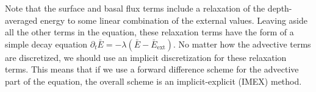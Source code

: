 \documentclass{article}
\theoremstyle{definition}
\theoremstyle{plain}
\begin{document}
Note that the surface and basal flux terms include a relaxation of the depth-averaged energy to some linear combination of the external values.
Leaving aside all the other terms in the equation, these relaxation terms have the form of a simple decay equation $\partial_t\bar E = -\lambda (\bar E - \bar E_{\text{ext}})$.
No matter how the advective terms are discretized, we should use an implicit discretization for these relaxation terms.
This means that if we use a forward difference scheme for the advective part of the equation, the overall scheme is an implicit-explicit (IMEX) method.

\pagebreak



\end{document}
